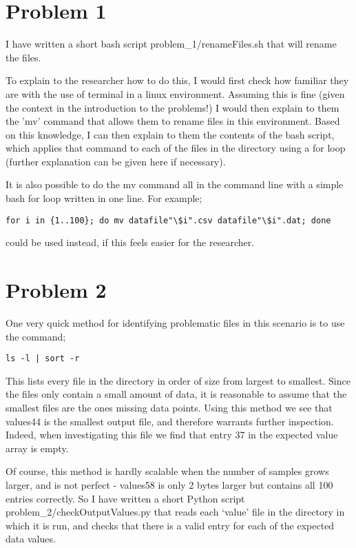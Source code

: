 \documentclass{article}
\begin{document}
\section*{Problem 1}

I have written a short bash script problem\_1/renameFiles.sh that will rename the files.

To explain to the researcher how to do this, I would first check how familiar they are with the use of terminal in a linux environment.
Assuming this is fine (given the context in the introduction to the problems!) I would then explain to them the 'mv' command that allows them to rename files in this environment.
Based on this knowledge, I can then explain to them the contents of the bash script, which applies that command to each of the files in the directory using a for loop (further explanation can be given here if necessary).

It is also possible to do the mv command all in the command line with a simple bash for loop written in one line.
For example; \begin{verbatim}for i in {1..100}; do mv datafile"\$i".csv datafile"\$i".dat; done\end{verbatim} could be used instead, if this feels easier for the researcher.

\section*{Problem 2}

One very quick method for identifying problematic files in this scenario is to use the command; \begin{verbatim}ls -l | sort -r\end{verbatim}
This lists every file in the directory in order of size from largest to smallest.
Since the files only contain a small amount of data, it is reasonable to assume that the smallest files are the ones missing data points.
Using this method we see that values44 is the smallest output file, and therefore warrants further inspection.
Indeed, when investigating this file we find that entry 37 in the expected value array is empty.

Of course, this method is hardly scalable when the number of samples grows larger, and is not perfect - values58 is only 2 bytes larger but contains all 100 entries correctly.
So I have written a short Python script problem\_2/checkOutputValues.py that reads each `value' file in the directory in which it is run, and checks that there is a valid entry for each of the expected data values.
\end{document}

